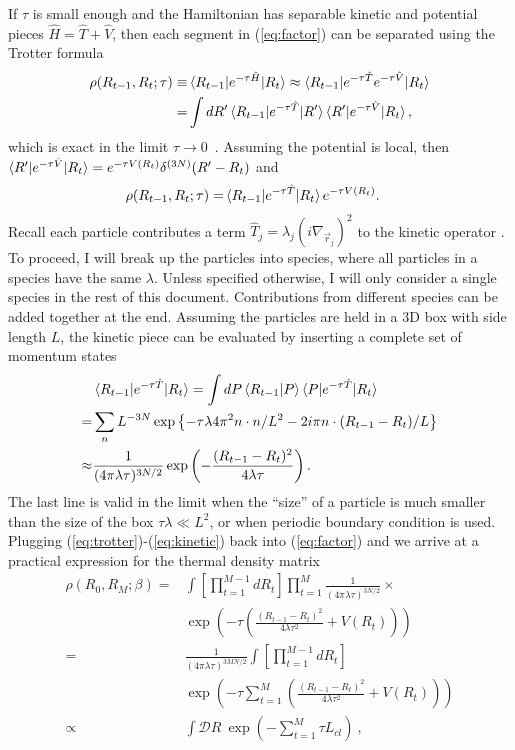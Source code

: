 \documentclass[prl,reprint]{revtex4-1}
\begin{document}
If $\tau$ is small enough and the Hamiltonian has separable kinetic and potential pieces $\hat{H}=\hat{T}+\hat{V}$, then each segment in (\ref{eq:factor}) can be separated using the Trotter formula
\begin{align}
\rho(R_{t-1},R_t;\tau)\equiv&\braket{R_{t-1}|e^{-\tau \hat{H}}|R_t}\approx\braket{R_{t-1}|e^{-\tau \hat{T}}e^{-\tau\hat{V}}|R_t}\nonumber \\
=&\int dR' \braket{R_{t-1}|e^{-\tau \hat{T}}|R'}\braket{R'|e^{-\tau\hat{V}}|R_t}, \label{eq:trotter}
\end{align}
which is exact in the limit $\tau\rightarrow0$~\cite{Bernu_book}. Assuming the potential is local, then $\braket{R'|e^{-\tau\hat{V}}|R_t}=e^{-\tau V(R_t)}\delta^{(3N)}(R'-R_t)$ and
\begin{align}
\rho(R_{t-1},R_t;\tau)=& \braket{R_{t-1}|e^{-\tau \hat{T}}|R_t}e^{-\tau V(R_t)}. \label{eq:local potential}
\end{align}
Recall each particle contributes a term $\hat{T}_j=\lambda_j(i\nabla_{\vec{r}_j})^2$ to the kinetic operator . To proceed, I will break up the particles into species, where all particles in a species have the same $\lambda$. Unless specified otherwise, I will only consider a single species in the rest of this document. Contributions from different species can be added together at the end. Assuming the particles are held in a 3D box with side length $L$, the kinetic piece can be evaluated by inserting a complete set of momentum states
\begin{align}
&\braket{R_{t-1}|e^{-\tau \hat{T}}|R_t}=\int dP\braket{R_{t-1}|P}\braket{P|e^{-\tau \hat{T}}|R_t} \nonumber \\
=&\sum_{n} L^{-3N}\exp\left\{-\tau\lambda 4\pi^2n\cdot n/L^2-2i\pi n\cdot(R_{t-1}-R_t)/L\right\} \nonumber \\
\approx& \frac{1}{(4\pi\lambda\tau)^{3N/2}}\exp\left(-\frac{(R_{t-1}-R_t)^2}{4\lambda\tau}\right). \label{eq:kinetic}
\end{align}
The last line is valid in the limit when the ``size'' of a particle is much smaller than the size of the box $\tau\lambda\ll L^2$, or when periodic boundary condition is used. Plugging (\ref{eq:trotter})-(\ref{eq:kinetic}) back into (\ref{eq:factor}) and we arrive at a practical expression for the thermal density matrix
\begin{align}
\rho(R_0,R_M;\beta)=&\int[\prod_{t=1}^{M-1} dR_t]\prod_{t=1}^{M} \frac{1}{(4\pi\lambda\tau)^{3N/2}}\times \nonumber \\
&\exp\left(-\tau(\frac{(R_{t-1}-R_t)^2}{4\lambda\tau^2}+V(R_t))\right) \nonumber \\
=&\frac{1}{(4\pi\lambda\tau)^{3MN/2}}\int[\prod_{t=1}^{M-1} dR_t] \nonumber \\
&\exp\left(-\tau\sum_{t=1}^M (\frac{(R_{t-1}-R_t)^2}{4\lambda\tau^2}+V(R_t)) \right) \nonumber \\
\propto& \int \mathcal{D}R~\exp (-\sum_{t=1}^M\tau L_{cl})~,
\end{align}
\end{document}
